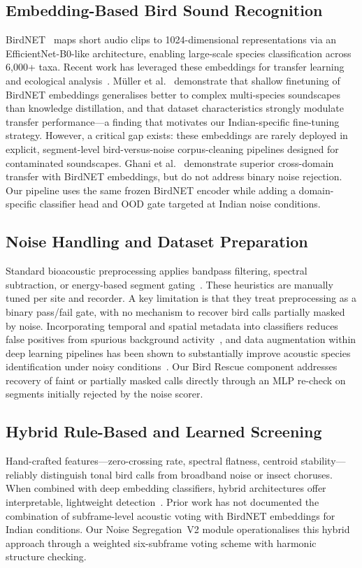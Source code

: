 \documentclass[conference]{IEEEtran}
\begin{document}
\subsection{Embedding-Based Bird Sound Recognition}
BirdNET~\cite{Kahl2021} maps short audio clips to 1024-dimensional representations via an EfficientNet-B0-like architecture, enabling large-scale species classification across 6,000+ taxa. Recent work has leveraged these embeddings for transfer learning and ecological analysis~\cite{McGinn2023,Ghani2023}. Müller et al.~\cite{Muller2025} demonstrate that shallow finetuning of BirdNET embeddings generalises better to complex multi-species soundscapes than knowledge distillation, and that dataset characteristics strongly modulate transfer performance---a finding that motivates our Indian-specific fine-tuning strategy. However, a critical gap exists: these embeddings are rarely deployed in explicit, segment-level bird-versus-noise corpus-cleaning pipelines designed for contaminated soundscapes. Ghani et al.~\cite{Ghani2023} demonstrate superior cross-domain transfer with BirdNET embeddings, but do not address binary noise rejection. Our pipeline uses the same frozen BirdNET encoder while adding a domain-specific classifier head and OOD gate targeted at Indian noise conditions.

\subsection{Noise Handling and Dataset Preparation}
Standard bioacoustic preprocessing applies bandpass filtering, spectral subtraction, or energy-based segment gating~\cite{Xie2021,Stowell2022}. These heuristics are manually tuned per site and recorder. A key limitation is that they treat preprocessing as a binary pass/fail gate, with no mechanism to recover bird calls partially masked by noise. Incorporating temporal and spatial metadata into classifiers reduces false positives from spurious background activity~\cite{Jeantet2023}, and data augmentation within deep learning pipelines has been shown to substantially improve acoustic species identification under noisy conditions~\cite{MacIsaac2024}. Our Bird Rescue component addresses recovery of faint or partially masked calls directly through an MLP re-check on segments initially rejected by the noise scorer.

\subsection{Hybrid Rule-Based and Learned Screening}
Hand-crafted features---zero-crossing rate, spectral flatness, centroid stability---reliably distinguish tonal bird calls from broadband noise or insect choruses. When combined with deep embedding classifiers, hybrid architectures offer interpretable, lightweight detection~\cite{Stowell2022}. Prior work has not documented the combination of subframe-level acoustic voting with BirdNET embeddings for Indian conditions. Our Noise Segregation~V2 module operationalises this hybrid approach through a weighted six-subframe voting scheme with harmonic structure checking.
\end{document}
